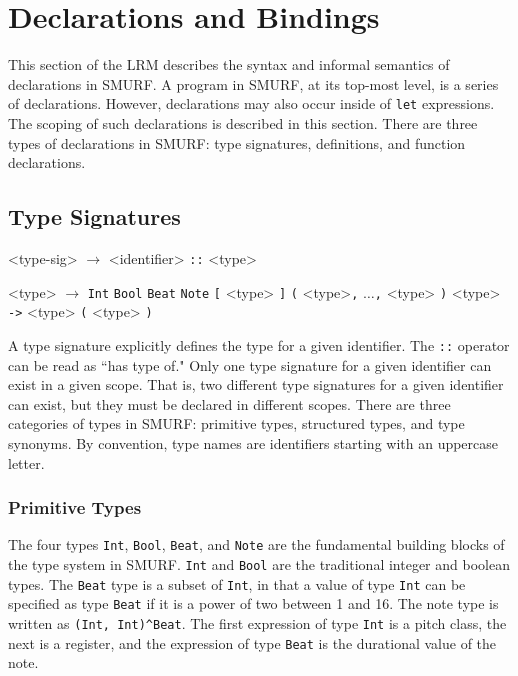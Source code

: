 \section{Declarations and Bindings}

This section of the LRM describes the syntax and informal semantics of
declarations in SMURF. A program in SMURF, at its top-most level, is a
series of declarations. However, declarations may also occur inside of
\texttt{let} expressions. The scoping of such declarations is described 
in this section. There are three types of declarations in SMURF: 
type signatures, definitions, and function declarations.

\subsection{Type Signatures}

\begin{grammar}

<type-sig> $\rightarrow$ <identifier> \texttt{::} <type>

<type> $\rightarrow$ \texttt{Int} \alt \texttt{Bool} \alt \texttt{Beat} \alt \texttt{Note} \alt
											\texttt{[} <type> \texttt{]} \alt \texttt{(} <type>\texttt{,} 
											$\ldots$\texttt{,} <type> \texttt{)} \alt <type> \texttt{->} <type>
											 \alt \texttt{(} <type> \texttt{)}
										

\end{grammar}

A type signature explicitly defines the type for a given identifier. The
\texttt{::} operator can be read as ``has type of." Only one type signature
for a given identifier can exist in a given scope. That is, two different
type signatures for a given identifier can exist, but they must be declared
in different scopes. There are three categories of types in SMURF: primitive
types,  structured types, and type synonyms. By convention, type
names are identifiers starting with an uppercase letter.

\subsubsection{Primitive Types}

The four types \texttt{Int}, \texttt{Bool}, \texttt{Beat}, and \texttt{Note} are
the fundamental building blocks of the type system in SMURF. \texttt{Int} and \texttt{Bool}
are the traditional integer and boolean types. The \texttt{Beat} type is a subset of 
\texttt{Int}, in that a value of type \texttt{Int} can be specified as type \texttt{Beat} if
it is a power of two between 1 and 16. 
The note type is written as \texttt{(Int, Int)\string^Beat}. The first expression of type
\texttt{Int} is a pitch class, the next is a register, and the expression of type \texttt{Beat}
is the durational value of the note.

